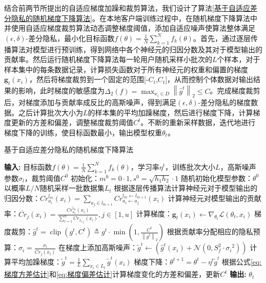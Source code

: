 结合前两节所提出的自适应梯度加躁和裁剪算法，我们设计了算法\ref{基于自适应差分隐私的随机梯度下降算法}。在本地客户端训练过程中，在随机梯度下降算法中并使用自适应梯度裁剪算法动态调整梯度阈值，添加自适应噪声使算法整体满足$(\epsilon, \delta)$-差分隐私，最小化目标函数$f(\theta)=\frac{1}{N} \sum_{k=1}^{N} f_{k}(\theta)$。首先，通过逐层传播算法对模型进行预训练，得到网络中各个神经元的归因分数及其对于模型输出的贡献率。然后运行随机梯度下降算法每一轮用户随机采样小批次的$L$个样本，对于样本集中的每条数据记录，计算损失函数对于所有神经元的权重和偏置的梯度$\mathbf{g}_{t}\left(x_{i}\right)$，然后将梯度裁剪到一个固定的范围[-$C_{t}$,$C_{t}$]，从而控制个体数据对输出结果的影响，此时梯度的敏感度为$\Delta_{2}(f)=\max _{x_{i} \in D}\left\|\hat{g}^{t}\right\|_{2} \leq C$。完成梯度裁剪后，对梯度添加与贡献率成反比的高斯噪声，得到满足$(\epsilon, \delta)$-差分隐私的梯度数据。之后计算批次大小为$L$的样本集的平均加躁梯度，然后进行梯度下降，计算梯度更新的方差和偏差，调整梯度裁剪阈值$C^{t}$。不断的重新采样数据，迭代地进行梯度下降的训练，使目标函数最小，输出模型权重$\theta_{t}$。
\begin{algorithm}[!htb]
	\caption{基于自适应差分隐私的随机梯度下降算法}
	\label{基于自适应差分隐私的随机梯度下降算法}
	\begin{algorithmic}[1]
		\footnotesize
		\STATE \textbf{输入:} 目标函数$f(\theta)=\frac{1}{N} \sum_{k=1}^{N} f_{k}(\theta)$，学习率$\eta^{t}$，训练批次大小$L$，高斯噪声参数$\sigma_{l}$，裁剪阈值$C^{0}$
		\STATE 初始化：$m^{0}=0 \cdot 1, s^{0}=\sqrt{h_{1} h_{2}} \cdot 1$
		\STATE 随机初始化模型参数：$\theta^{0}$
			\STATE 以概率$L / N$随机采样一批数据集$L_{t}$
				\STATE 根据逐层传播算法计算神经元对于模型输出的归因分数：$Cr_{a_{i}}^{l_{m}}\left(x_{i}\right)=\sum_{a_{j} \in l_{m+1}} Cr_{a_{i} \leftarrow a_{j}}^{l_{m} \leftarrow l_{m+1}}\left(x_{i}\right)$
				\STATE 计算神经元对模型输出的贡献率：$\ddot{Cr_{j}}\left(x_{i}\right)=\frac{Cr_{a_{i}}^{l_{m}}\left(x_{i}\right)}{\sum_{i=1}^{n} Cr_{x_{i, j}}\left(x_{i}\right)}, j \in[1, u]$
				\STATE 计算梯度：$\mathbf{g}_{t}\left(x_{i}\right) \leftarrow \nabla_{\theta_{t}} \mathcal{L}\left(\theta_{t}, x_{i}\right)$
				\STATE 梯度裁剪：$\hat{g}^{t}=\operatorname{clip}\left(g^{t}, C^{t}\right) \triangleq g^{t} \cdot \min \left(1, \frac{C^{t}}{\left\|g^{t}\right\|_{2}}\right)$
				\STATE 根据贡献率分配相应的隐私预算：$\sigma_{i}=\frac{\sigma_{l}}{\ddot{Cr_{j}}\left(x_{i}\right)}$
				\STATE 在梯度上添加高斯噪声：$\tilde{g}^{t}\leftarrow \left(\hat{g}^{t}\left(x_{i}\right)+\mathcal{N}\left(0, S_{f}^{2} \cdot {\sigma_{i}}^{2}\right)\right)$
			\ENDFOR
			\STATE 计算平均加躁梯度：$\tilde{g}^{t}=\frac{1}{L} \sum_{x_{i} \in L_{t}} \tilde{g}^{t}(x_{i})$
			\STATE 梯度下降：$\theta^{t+1}=\theta^{t}-\eta^{t} \tilde{g}^{t}$
			\STATE 根据公式\ref{eq:梯度方差估计}和\ref{eq:梯度偏差估计}计算梯度变化的方差和偏差，更新$C^{t}$
		\ENDFOR
		\STATE \textbf{输出:} $\theta_{t}$
	\end{algorithmic}
\end{algorithm}

